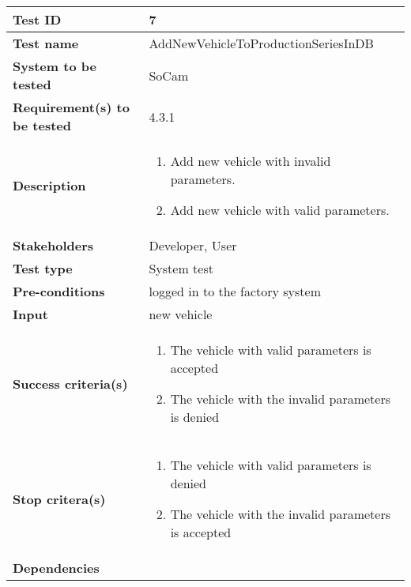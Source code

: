 				\begin{table}[H]
			\begin{tabular}{| p{4cm} | p{10cm} |}
			\hline
			\rowcolor{gray}
				{\bf Test ID} & 7 \\ \hline
				{\bf Test name} & AddNewVehicleToProductionSeriesInDB \\ \hline
				{\bf System to be tested} & SoCam \\ \hline
				{\bf Requirement(s) to be tested} & 4.3.1 \\ \hline
				{\bf Description} & 
					\begin{enumerate}
						\item Add new vehicle with invalid parameters.
						\item Add new vehicle with valid parameters.
					\end{enumerate}
				\\ \hline
				{\bf Stakeholders} & Developer, User \\ \hline
				{\bf Test type} & System test \\ \hline
				{\bf Pre-conditions} & logged in to the factory system \\ \hline
				{\bf Input} & new vehicle \\ \hline
				{\bf Success criteria(s)} & 
					\begin{enumerate}
						\item The vehicle with valid parameters is accepted
						\item The vehicle with the invalid parameters is denied 
					\end{enumerate}
				\\ \hline
				{\bf Stop critera(s)} &  
					\begin{enumerate}
						\item The vehicle with valid parameters is denied 
						\item The vehicle with the invalid parameters is accepted
					\end{enumerate} \\ \hline
				{\bf Dependencies} & \\ \hline
			\end{tabular}
		\end{table}